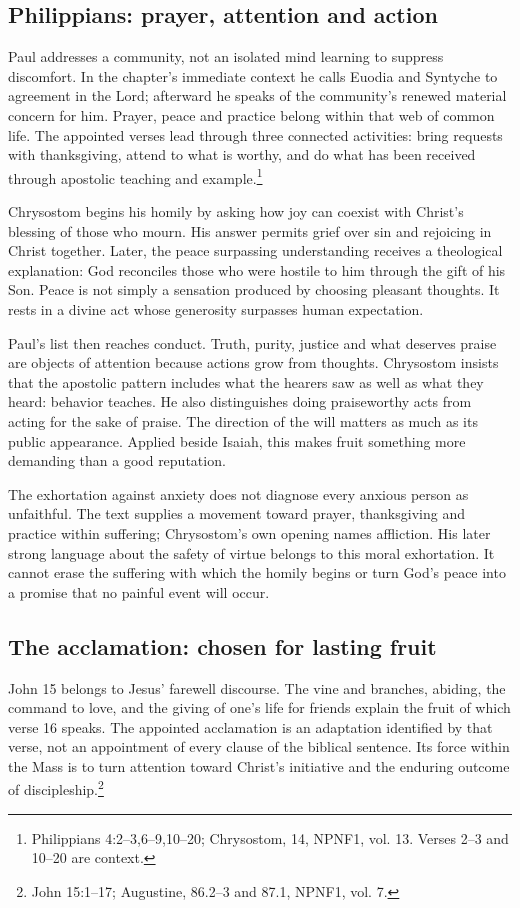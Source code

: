 \subsection{Philippians: prayer, attention and action}
Paul addresses a community, not an isolated mind learning to suppress discomfort. In the chapter's immediate context he calls Euodia and Syntyche to agreement in the Lord; afterward he speaks of the community's renewed material concern for him. Prayer, peace and practice belong within that web of common life. The appointed verses lead through three connected activities: bring requests with thanksgiving, attend to what is worthy, and do what has been received through apostolic teaching and example.\footnote{Philippians 4:2--3,6--9,10--20; Chrysostom,  14, NPNF1, vol. 13. Verses 2--3 and 10--20 are context.}

Chrysostom begins his homily by asking how joy can coexist with Christ's blessing of those who mourn. His answer permits grief over sin and rejoicing in Christ together. Later, the peace surpassing understanding receives a theological explanation: God reconciles those who were hostile to him through the gift of his Son. Peace is not simply a sensation produced by choosing pleasant thoughts. It rests in a divine act whose generosity surpasses human expectation.

Paul's list then reaches conduct. Truth, purity, justice and what deserves praise are objects of attention because actions grow from thoughts. Chrysostom insists that the apostolic pattern includes what the hearers saw as well as what they heard: behavior teaches. He also distinguishes doing praiseworthy acts from acting for the sake of praise. The direction of the will matters as much as its public appearance. Applied beside Isaiah, this makes fruit something more demanding than a good reputation.

The exhortation against anxiety does not diagnose every anxious person as unfaithful. The text supplies a movement toward prayer, thanksgiving and practice within suffering; Chrysostom's own opening names affliction. His later strong language about the safety of virtue belongs to this moral exhortation. It cannot erase the suffering with which the homily begins or turn God's peace into a promise that no painful event will occur.

\subsection{The acclamation: chosen for lasting fruit}
John 15 belongs to Jesus' farewell discourse. The vine and branches, abiding, the command to love, and the giving of one's life for friends explain the fruit of which verse 16 speaks. The appointed acclamation is an adaptation identified by that verse, not an appointment of every clause of the biblical sentence. Its force within the Mass is to turn attention toward Christ's initiative and the enduring outcome of discipleship.\footnote{John 15:1--17; Augustine,  86.2--3 and 87.1, NPNF1, vol. 7.}


